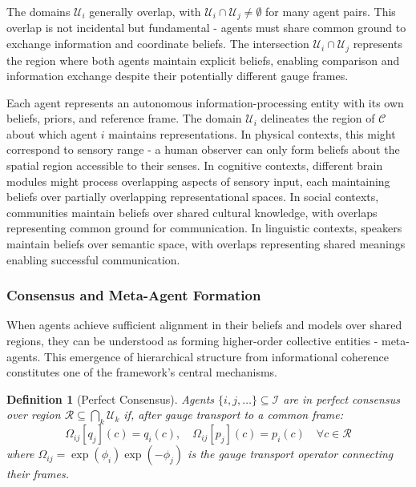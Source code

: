 \documentclass[11pt]{article}
\newtheorem{definition}{Definition}
\begin{document}
The domains $\mathcal{U}_i$ generally overlap, with $\mathcal{U}_i \cap \mathcal{U}_j \neq \emptyset$ for many agent pairs. This overlap is not incidental but fundamental - agents must share common ground to exchange information and coordinate beliefs. The intersection $\mathcal{U}_i \cap \mathcal{U}_j$ represents the region where both agents maintain explicit beliefs, enabling comparison and information exchange despite their potentially different gauge frames.

Each agent represents an autonomous information-processing entity with its own beliefs, priors, and reference frame. The domain $\mathcal{U}_i$ delineates the region of $\mathcal{C}$ about which agent $i$ maintains representations. In physical contexts, this might correspond to sensory range - a human observer can only form beliefs about the spatial region accessible to their senses. In cognitive contexts, different brain modules might process overlapping aspects of sensory input, each maintaining beliefs over partially overlapping representational spaces. In social contexts, communities maintain beliefs over shared cultural knowledge, with overlaps representing common ground for communication. In linguistic contexts, speakers maintain beliefs over semantic space, with overlaps representing shared meanings enabling successful communication.

\subsubsection{Consensus and Meta-Agent Formation}

When agents achieve sufficient alignment in their beliefs and models over shared regions, they can be understood as forming higher-order collective entities - meta-agents. This emergence of hierarchical structure from informational coherence constitutes one of the framework's central mechanisms.

\begin{definition}[Perfect Consensus]
Agents $\{i, j, \ldots\} \subseteq \mathcal{I}$ are in perfect consensus over region $\mathcal{R} \subseteq \bigcap_k \mathcal{U}_k$ if, after gauge transport to a common frame:
\begin{equation}
\Omega_{ij}[q_j](c) = q_i(c), \quad \Omega_{ij}[p_j](c) = p_i(c) \quad \forall c \in \mathcal{R}
\end{equation}
where $\Omega_{ij} = \exp(\phi_i)\exp(-\phi_j)$ is the gauge transport operator connecting their frames.
\end{definition}
\end{document}
